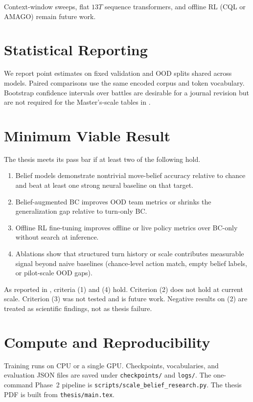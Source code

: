 Context-window sweeps, flat $13T$ sequence transformers, and offline RL
(CQL or AMAGO) remain future work.

\section{Statistical Reporting}

We report point estimates on fixed validation and OOD splits shared across
models. Paired comparisons use the same encoded corpus and token vocabulary.
Bootstrap confidence intervals over battles are desirable for a journal revision
but are not required for the Master's-scale tables in .

\section{Minimum Viable Result}

The thesis meets its pass bar if at least two of the following hold.
\begin{enumerate}
  \item Belief models demonstrate nontrivial move-belief accuracy relative to
    chance and beat at least one strong neural baseline on that target.
  \item Belief-augmented BC improves OOD team metrics or shrinks the
    generalization gap relative to turn-only BC.
  \item Offline RL fine-tuning improves offline or live policy metrics over
    BC-only without search at inference.
  \item Ablations show that structured turn history or scale contributes
    measurable signal beyond naive baselines (chance-level action match,
    empty belief labels, or pilot-scale OOD gaps).
\end{enumerate}

As reported in , criteria (1) and (4) hold. Criterion (2) does
not hold at current scale. Criterion (3) was not tested and is future work.
Negative results on (2) are treated as scientific findings, not as thesis
failure.

\section{Compute and Reproducibility}

Training runs on CPU or a single GPU. Checkpoints, vocabularies, and evaluation
JSON files are saved under \texttt{checkpoints/} and \texttt{logs/}. The
one-command Phase~2 pipeline is \texttt{scripts/scale\_belief\_research.py}.
The thesis PDF is built from \texttt{thesis/main.tex}.
